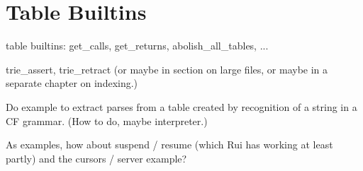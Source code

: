 \chapter{Table Builtins}

table builtins: get\_calls, get\_returns, abolish\_all\_tables, ...

trie\_assert, trie\_retract (or maybe in section on large files, or
maybe in a separate chapter on indexing.)

Do example to extract parses from a table created by recognition of a
string in a CF grammar.  (How to do, maybe interpreter.)

As examples, how about suspend / resume (which Rui has working at least
partly) and the cursors / server example?

